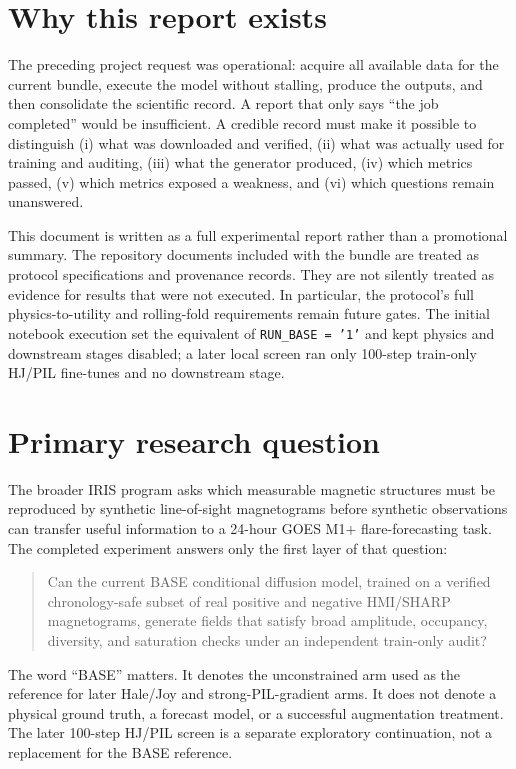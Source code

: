 \documentclass[11pt,oneside]{report}
\begin{document}
\section{Why this report exists}

The preceding project request was operational: acquire all available data for the current bundle, execute the model without stalling, produce the outputs, and then consolidate the scientific record. A report that only says “the job completed” would be insufficient. A credible record must make it possible to distinguish (i) what was downloaded and verified, (ii) what was actually used for training and auditing, (iii) what the generator produced, (iv) which metrics passed, (v) which metrics exposed a weakness, and (vi) which questions remain unanswered.

This document is written as a full experimental report rather than a promotional summary. The repository documents included with the bundle are treated as protocol specifications and provenance records. They are not silently treated as evidence for results that were not executed. In particular, the protocol’s full physics-to-utility and rolling-fold requirements remain future gates. The initial notebook execution set the equivalent of \texttt{RUN\_BASE = '1'} and kept physics and downstream stages disabled; a later local screen ran only 100-step train-only HJ/PIL fine-tunes and no downstream stage.

\section{Primary research question}

The broader IRIS program asks which measurable magnetic structures must be reproduced by synthetic line-of-sight magnetograms before synthetic observations can transfer useful information to a 24-hour GOES M1+ flare-forecasting task. The completed experiment answers only the first layer of that question:

\begin{quote}
Can the current BASE conditional diffusion model, trained on a verified chronology-safe subset of real positive and negative HMI/SHARP magnetograms, generate fields that satisfy broad amplitude, occupancy, diversity, and saturation checks under an independent train-only audit?
\end{quote}

The word ``BASE'' matters. It denotes the unconstrained arm used as the reference for later Hale/Joy and strong-PIL-gradient arms. It does not denote a physical ground truth, a forecast model, or a successful augmentation treatment. The later 100-step HJ/PIL screen is a separate exploratory continuation, not a replacement for the BASE reference.
\end{document}
